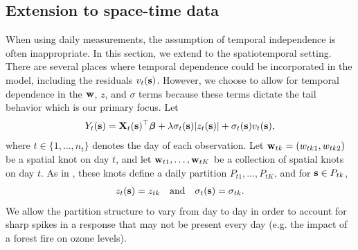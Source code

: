 \documentclass[useAMS,usenatbib,referee]{biom}
\begin{document}
\subsection{Extension to space-time data} \label{sts:temporal}
When using daily measurements, the assumption of temporal independence is often inappropriate.
In this section, we extend  to the spatiotemporal setting.
There are several places where temporal dependence could be incorporated in the model, including the residuals $v_t(\mbox{\bf s})$.
However, we choose to allow for temporal dependence in the $\mbox{\bf w}$, $z$, and $\sigma$ terms because these terms dictate the tail behavior which is our primary focus.
Let
\begin{align} \label{steq:spatiotemp}
  Y_t(\bs) = \bX_t(\bs)^\top \bbeta + \lambda \sigma_t(\bs) |z_t(\bs)| + \sigma_t(\bs) v_t(\bs),
\end{align}
where $t \in \{1, \ldots, n_t\}$ denotes the day of each observation.
Let \hbox{$\mbox{\bf w}_{tk} = (w_{tk1}, w_{tk2})$} be a spatial knot on day $t$, and let $\mbox{\bf w}_{t1}, \ldots, \mbox{\bf w}_{tK}$ be a collection of spatial knots on day $t$.
As in , these knots define a daily partition $P_{t1}, \ldots, P_{tK}$, and for $\mbox{\bf s} \in P_{tk}$,
\begin{align}
  z_t(\mbox{\bf s}) = z_{tk}\quad \text{and} \quad \sigma_{t}(\mbox{\bf s}) = \sigma_{tk}.
\end{align}
We allow the partition structure to vary from day to day in order to account for sharp spikes in a response that may not be present every day (e.g. the impact of a forest fire on ozone levels).
\end{document}
